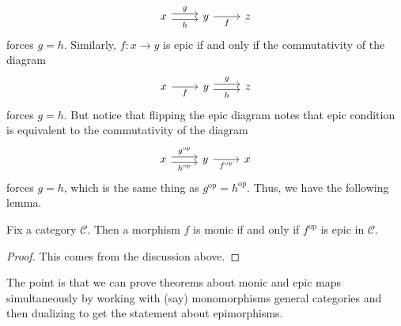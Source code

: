 \[\begin{tikzcd}
	x & y & z
	\arrow["g", shift left=1, from=1-1, to=1-2]
	\arrow["h"', shift right=1, from=1-1, to=1-2]
	\arrow["f"', from=1-2, to=1-3]
\end{tikzcd}\]
forces $g=h$. Similarly, $f:x\to y$ is epic if and only if the commutativity of the diagram
\[\begin{tikzcd}
	x & y & z
	\arrow["g", shift left=1, from=1-2, to=1-3]
	\arrow["h"', shift right=1, from=1-2, to=1-3]
	\arrow["f"', from=1-1, to=1-2]
\end{tikzcd}\]
forces $g=h$. But notice that flipping the epic diagram notes that epic condition is equivalent to the commutativity of the diagram
\[\begin{tikzcd}
	x & y & x
	\arrow["{g^\mathrm{op}}", shift left=1, from=1-1, to=1-2]
	\arrow["{h^\mathrm{op}}"', shift right=1, from=1-1, to=1-2]
	\arrow["{f^\mathrm{op}}"', from=1-2, to=1-3]
\end{tikzcd}\]
forces $g=h$, which is the same thing as $g^\mathrm{op}=h^\mathrm{op}$. Thus, we have the following lemma.
\begin{lemma}
	Fix a category $\mathcal C$. Then a morphism $f$ is monic if and only if $f^\mathrm{op}$ is epic in $\mathcal C$.
\end{lemma}
\begin{proof}
	This comes from the discussion above.
\end{proof}
The point is that we can prove theorems about monic and epic maps simultaneously by working with (say) monomorphisms general categories and then dualizing to get the statement about epimorphisms.

